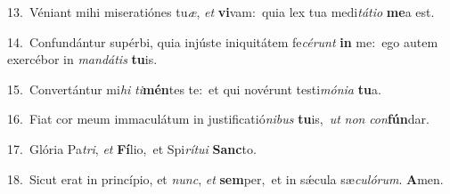 {\numbfont\textcolor{\numbcolor}{13.}}~Véniant mihi miseratiónes tu\-\textit{æ}\-, \textit{et} \textbf{vi}\-vam:~\star quia lex tua medi\-\textit{tá}\-\textit{ti}\textit{o} \textbf{me}\-a est.\par
{\numbfont\textcolor{\numbcolor}{14.}}~Confundántur supérbi, quia injúste iniquitátem fe\-\textit{cé}\-\textit{runt} \textbf{in} me:~\star ego autem exercébor in \textit{man}\-\textit{dá}\textit{tis} \textbf{tu}\-is.\par
{\numbfont\textcolor{\numbcolor}{15.}}~Convertántur mi\textit{hi} \textit{ti}\-\textbf{mén}tes te:~\star et qui novérunt testi\-\textit{mó}\-\textit{ni}\textit{a} \textbf{tu}\-a.\par
{\numbfont\textcolor{\numbcolor}{16.}}~Fiat cor meum immaculátum in justificatió\-\textit{ni}\-\textit{bus} \textbf{tu}\-is,~\star \textit{ut} \textit{non} \textit{con}\-\textbf{fún}dar.\par
{\numbfont\textcolor{\numbcolor}{17.}}~Glória Pa\-\textit{tri}\-, \textit{et} \textbf{Fí}\-lio,~\star et Spi\-\textit{rí}\-\textit{tu}\textit{i} \textbf{Sanc}\-to.\par
{\numbfont\textcolor{\numbcolor}{18.}}~Sicut erat in princípio, et \textit{nunc}\-, \textit{et} \textbf{sem}\-per,~\star et in sǽcula sæ\-\textit{cu}\-\textit{ló}\textit{rum}. \textbf{A}\-men.\par
